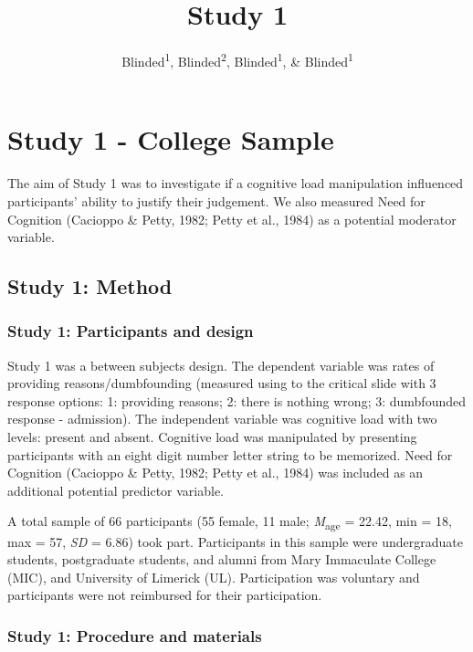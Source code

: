 \documentclass[
  american,
  man,floatsintext]{apa7}
\title{Study 1}
\author{Blinded\textsuperscript{1}, Blinded\textsuperscript{2}, Blinded\textsuperscript{1}, \& Blinded\textsuperscript{1}}
\date{}
\affiliation{\vspace{0.5cm}\textsuperscript{1} Blinded\\\textsuperscript{2} Blinded}
\begin{document}
\maketitle

\hypertarget{study-1---college-sample}{%
\section{Study 1 - College Sample}\label{study-1---college-sample}}

The aim of Study 1 was to investigate if a cognitive load manipulation influenced participants' ability to justify their judgement. We also measured Need for Cognition (Cacioppo \& Petty, 1982; Petty et al., 1984) as a potential moderator variable.

\hypertarget{study-1-method}{%
\subsection{Study 1: Method}\label{study-1-method}}

\hypertarget{study-1-participants-and-design}{%
\subsubsection{Study 1: Participants and design}\label{study-1-participants-and-design}}

Study 1 was a between subjects design. The dependent variable was rates of providing reasons/dumbfounding (measured using to the critical slide with 3 response options: 1: providing reasons; 2: there is nothing wrong; 3: dumbfounded response - admission). The independent variable was cognitive load with two levels: present and absent. Cognitive load was manipulated by presenting participants with an eight digit number letter string to be memorized. Need for Cognition (Cacioppo \& Petty, 1982; Petty et al., 1984) was included as an additional potential predictor variable.

A total sample of 66 participants (55 female, 11 male; \emph{M}\textsubscript{age} = 22.42, min = 18, max = 57, \emph{SD} = 6.86) took part. Participants in this sample were undergraduate students, postgraduate students, and alumni from Mary Immaculate College (MIC), and University of Limerick (UL). Participation was voluntary and participants were not reimbursed for their participation.

\hypertarget{study-1-procedure-and-materials}{%
\subsubsection{Study 1: Procedure and materials}\label{study-1-procedure-and-materials}}
\end{document}
